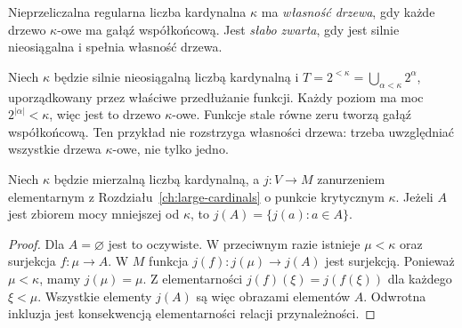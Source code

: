 \begin{definicja}
\label{def:lc38-weak-compact}
Nieprzeliczalna regularna
liczba kardynalna $\kappa$ ma
\emph{własność drzewa}, gdy każde
drzewo $\kappa$-owe ma
gałąź współkońcową.
Jest \emph{słabo zwarta},
gdy jest silnie nieosiągalna
i spełnia własność drzewa.
\end{definicja}

\begin{przyklad}
\label{ex:lc38-binary}
Niech $\kappa$ będzie silnie
nieosiągalną liczbą kardynalną i
$T=2^{<\kappa}
 =\bigcup_{\alpha<\kappa}2^\alpha$,
uporządkowany przez właściwe
przedłużanie funkcji.
Każdy poziom ma moc
$2^{|\alpha|}<\kappa$,
więc jest to drzewo $\kappa$-owe.
Funkcje stale równe zeru
tworzą gałąź współkońcową.
Ten przykład nie rozstrzyga
własności drzewa: trzeba
uwzględniać wszystkie drzewa
$\kappa$-owe, nie tylko jedno.
\end{przyklad}

\begin{lemat}
\label{lem:lc38-small-image}
Niech $\kappa$ będzie mierzalną liczbą kardynalną,
a $j:V\to M$ zanurzeniem elementarnym
z Rozdziału~\ref{ch:large-cardinals}
o punkcie krytycznym $\kappa$.
Jeżeli $A$ jest zbiorem mocy
mniejszej od $\kappa$, to
$j(A)=\{j(a):a\in A\}$.
\end{lemat}
\begin{proof}
Dla $A=\varnothing$ jest to oczywiste.
W przeciwnym razie istnieje
$\mu<\kappa$ oraz surjekcja
$f:\mu\to A$. W $M$ funkcja
$j(f):j(\mu)\to j(A)$ jest
surjekcją. Ponieważ $\mu<\kappa$,
mamy $j(\mu)=\mu$.
Z elementarności
$j(f)(\xi)=j(f(\xi))$
dla każdego $\xi<\mu$.
Wszystkie elementy $j(A)$
są więc obrazami elementów $A$.
Odwrotna inkluzja jest
konsekwencją elementarności
relacji przynależności.
\end{proof}

